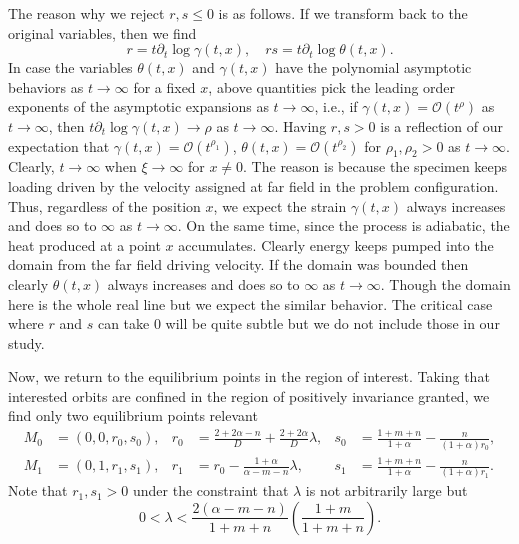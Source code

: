 \documentclass[a4paper,11pt]{article}
\theoremstyle{remark}
\begin{document}
The reason why we reject $r,s\le0$ is as follows. If we transform back to the original variables, then we find
\begin{equation*}
 r=t\partial_t\log \gamma(t,x), \quad rs=t\partial_t \log \theta(t,x).
\end{equation*}
In case the variables $\theta(t,x)$ and $\gamma(t,x)$ have the polynomial asymptotic behaviors as $t \rightarrow \infty$ for a fixed $x$, above quantities pick the leading order exponents of the asymptotic expansions as $t \rightarrow \infty$, i.e., if $\gamma(t,x) = \mathcal{O}(t^\rho)$ as $t \rightarrow \infty$, then $t\partial_t\log \gamma(t,x) \rightarrow \rho$ as $t \rightarrow \infty$. Having $r,s>0$ is a reflection of our expectation that $\gamma(t,x) = \mathcal{O}(t^{\rho_1})$, $\theta(t,x) = \mathcal{O}(t^{\rho_2})$ for $\rho_1,\rho_2 >0$ as $t \rightarrow \infty$. Clearly, $t \rightarrow \infty$ when $\xi \rightarrow \infty$ for $x\ne0$. The reason is because the specimen keeps loading driven by the velocity assigned at far field in the problem configuration. Thus, regardless of the position $x$, we expect the strain $\gamma(t,x)$ always increases and does so to  $\infty$ as $t \rightarrow\infty$. On the same time, since the process is adiabatic, the heat produced at a point $x$ accumulates. Clearly energy keeps pumped into the domain from the far field driving velocity. If the domain was bounded then clearly $\theta(t,x)$ always increases and does so to  $\infty$ as $t \rightarrow\infty$. Though the domain here is the whole real line but we expect the similar behavior. The critical case where $r$ and $s$ can take $0$ will be quite subtle but we do not include those in our study.

Now, we return to the equilibrium points in the region of interest.
Taking that interested orbits are confined in the region of positively invariance granted, we find only two equilibrium points relevant
\begin{align*}
 M_0 &= (0,0,r_0,s_0), & r_0 &=\frac{2+2\alpha-n}{D} + \frac{2+2\alpha}{D}\lambda, & s_0&=\frac{1+m+n}{1+\alpha} - \frac{n}{(1+\alpha)r_0},\\
 M_1 &= (0,1,r_1,s_1), & r_1 &= r_0-\frac{1+\alpha}{\alpha-m-n}\lambda, & s_1&=\frac{1+m+n}{1+\alpha} - \frac{n}{(1+\alpha)r_1}.
\end{align*}
Note that $r_1,s_1>0$ under the constraint that $\lambda$ is not arbitrarily large but
\begin{equation} \label{eq:lambda-range}
 0< \lambda < \frac{2(\alpha-m-n)}{1+m+n}\left(\frac{1+m}{1+m+n}\right).
\end{equation}
\end{document}
